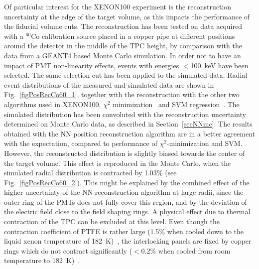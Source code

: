 Of particular interest for the XENON100 experiment is the reconstruction uncertainty at the edge of the target volume, as this impacts the performance of the fiducial volume cuts. The reconstruction has been tested on data acquired with a $^{60}$Co calibration source placed in a copper pipe at different positions around the detector in the middle of the TPC height, by comparison with the data from a GEANT4 based Monte Carlo simulation. In order not to have an impact of PMT non-linearity effects, events with energies $<$100~keV have been selected. The same selection cut has been applied to the simulated data. Radial event distributions of the measured and simulated data are shown in Fig.~\ref{figPosRecCo60_1}, together with the reconstruction with the other two algorithms used in XENON100, $\chi^{2}$ minimization~\cite{Yuan} and SVM regression~\cite{Antonio}. The simulated distribution has been convoluted with the reconstruction uncertainty determined on Monte Carlo data, as described in Section~\ref{secNNmc}. The results obtained with the NN position reconstruction algorithm are in a better agreement with the expectation, compared to performance of $\chi^{2}$-minimization and SVM. However, the reconstructed distribution is slightly biased towards the center of the target volume. This effect is reproduced in the Monte Carlo, when the simulated radial distribution is contracted by 1.03\% (see Fig.~\ref{figPosRecCo60_2}). This might be explained by the combined effect of the higher uncertainty of the NN reconstruction algorithm at large radii, since the outer ring of the PMTs does not fully cover this region, and by the deviation of the electric field close to the field shaping rings. A physical effect due to thermal contraction of the TPC can be excluded at this level. Even though the contraction coefficient of PTFE is rather large (1.5\% when cooled down to the liquid xenon temperature of 182~K)~\cite{PTFEcontraction}, the interlocking panels are fixed by copper rings which do not contract significantly ($<$0.2\% when cooled from room temperature to 182~K)~\cite{CopperContruction}.

